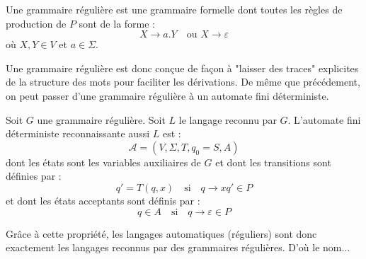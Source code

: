\begin{definition}
    Une grammaire régulière est une grammaire formelle dont toutes les règles de production de $P$ sont de la forme :
        \[ X \longrightarrow a.Y \quad \text{ou } X \longrightarrow \varepsilon \]
    où $X,Y \in V$ et $a \in \Sigma$.  
\end{definition}

Une grammaire régulière est donc conçue de façon à "laisser des traces" explicites de la structure des 
mots pour faciliter les dérivations. De même que précédement, on peut passer d'une grammaire régulière à un automate 
fini déterministe. 

\begin{proposition}
    Soit $G$ une grammaire régulière. Soit $L$ le langage reconnu par $G$.
    L'automate fini déterministe reconnaissante aussi $L$ est : 
        \[ \mathcal{A} = (V,\Sigma, T, q_0 = S, A) \] 
    dont les états sont les variables auxiliaires de $G$ et dont les transitions sont définies par : 
        \[ q' = T(q,x) \quad \text{si} \quad q \longrightarrow x q' \in P \] 
    et dont les états acceptants sont définis par :
        \[ q \in A \quad \text{si} \quad q \longrightarrow \varepsilon \in P \]  
\end{proposition}

\begin{remark}
    Grâce à cette propriété, les langages automatiques (réguliers) sont donc exactement les langages reconnus par des grammaires régulières. 
    D'où le nom...
\end{remark}


